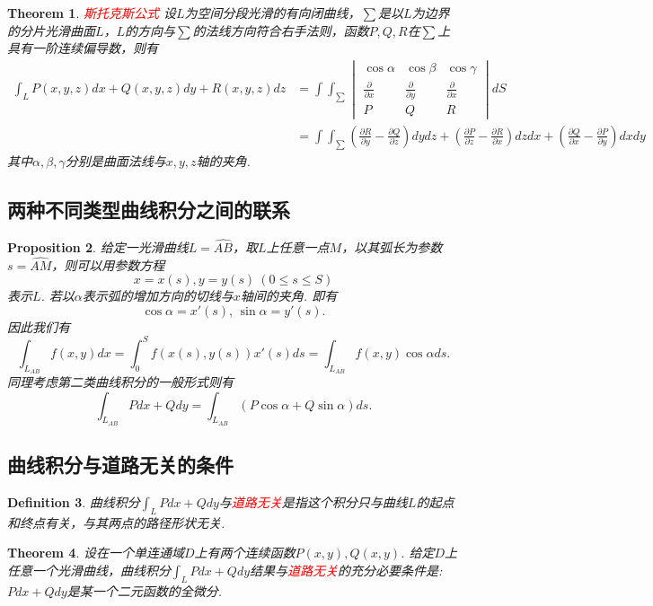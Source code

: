 \documentclass{article}
\newtheorem{theorem}{Theorem}[section]
\newtheorem{proposition}[theorem]{Proposition}
\newtheorem{definition}[theorem]{Definition}
\newcommand{\redt}[1]{\textcolor{red}{#1}}
\begin{document}
\begin{theorem}
\rm \redt{斯托克斯公式} 设$L$为空间分段光滑的有向闭曲线，$\sum$是以$L$为边界的分片光滑曲面$L$，$L$的方向与$\sum$的法线方向符合右手法则，函数$P,Q,R$在$\sum$上具有一阶连续偏导数，则有
$$
\begin{array}{ll}
\int_L P(x,y,z)dx + Q(x,y,z)dy + R(x,y,z)dz &= 
\int\int_\sum
\begin{vmatrix}
\cos \alpha & \cos \beta & \cos \gamma \\
\frac{\partial}{\partial x} & \frac{\partial}{\partial y} & \frac{\partial}{\partial x} \\
P & Q & R
\end{vmatrix} dS \\
&= \int\int_\sum (\frac{\partial R}{\partial y}-\frac{\partial Q}{\partial z})dydz + (\frac{\partial P}{\partial z}-\frac{\partial R}{\partial x})dzdx + (\frac{\partial Q}{\partial x}-\frac{\partial P}{\partial y})dxdy
\end{array}
$$
其中$\alpha,\beta,\gamma$分别是曲面法线与$x,y,z$轴的夹角. 
\end{theorem}

\subsection{两种不同类型曲线积分之间的联系}

\begin{proposition}
\rm 给定一光滑曲线$L=\widehat{AB}$，取$L$上任意一点$M$，以其弧长为参数$s=\widehat{AM}$，则可以用参数方程
$$
x=x(s),y=y(s) ~ (0 \leq s \leq S)
$$
表示$L$. 若以$\alpha$表示弧的增加方向的切线与$x$轴间的夹角. 即有
$$
\cos \alpha = x'(s), \, \sin \alpha = y'(s).
$$
因此我们有
$$
\int_{L_{AB}} f(x,y)dx = \int_0^S f(x(s),y(s))x'(s)ds = \int_{L_{AB}} f(x,y)\cos \alpha ds.
$$
同理考虑第二类曲线积分的一般形式则有
$$
\int_{L_{AB}}Pdx+Qdy = \int_{L_{AB}} (P\cos\alpha +Q\sin\alpha)ds.
$$
\end{proposition}

\newpage
\subsection{曲线积分与道路无关的条件}

\begin{definition}
\rm 曲线积分$\int_L Pdx + Qdy$与\redt{道路无关}是指这个积分只与曲线$L$的起点和终点有关，与其两点的路径形状无关. 
\end{definition}

\begin{theorem}\label{line-integral: path-independent}
\rm 设在一个单连通域$D$上有两个连续函数$P(x,y),Q(x,y)$. 给定$D$上任意一个光滑曲线，曲线积分$\int_L Pdx + Qdy$结果与\redt{道路无关}的充分必要条件是: $Pdx+Qdy$是某一个二元函数的全微分. 
\end{theorem}
\end{document}
